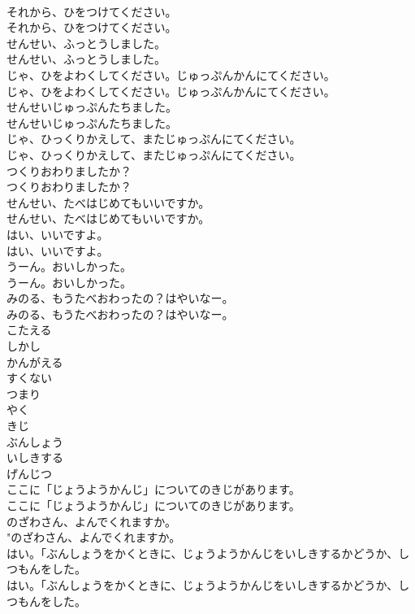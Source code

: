 \documentclass[8pt]{extreport}
\begin{document}
\begin{CJK}{UTF8}{min}
\\	それから、ひをつけてください。	
\\	それから、ひをつけてください。 
\\	せんせい、ふっとうしました。	
\\	せんせい、ふっとうしました。 
\\	じゃ、ひをよわくしてください。じゅっぷんかんにてください。	
\\	じゃ、ひをよわくしてください。じゅっぷんかんにてください。 
\\	せんせいじゅっぷんたちました。	
\\	せんせいじゅっぷんたちました。 
\\	じゃ、ひっくりかえして、またじゅっぷんにてください。	
\\	じゃ、ひっくりかえして、またじゅっぷんにてください。 
\\	つくりおわりましたか？	
\\	つくりおわりましたか？ 
\\	せんせい、たべはじめてもいいですか。	
\\	せんせい、たべはじめてもいいですか。 
\\	はい、いいですよ。	
\\	はい、いいですよ。 
\\	うーん。おいしかった。	
\\	うーん。おいしかった。 
\\	みのる、もうたべおわったの？はやいなー。	
\\	みのる、もうたべおわったの？はやいなー。 
\\	こたえる
\\	しかし
\\	かんがえる
\\	すくない
\\	つまり
\\	やく
\\	きじ
\\	ぶんしょう
\\	いしきする
\\	げんじつ
\\	ここに「じょうようかんじ」についてのきじがあります。	
\\	ここに「じょうようかんじ」についてのきじがあります。 
\\	のざわさん、よんでくれますか。	
\\	"のざわさん、よんでくれますか。 
\\	はい。「ぶんしょうをかくときに、じょうようかんじをいしきするかどうか、しつもんをした。	
\\	はい。「ぶんしょうをかくときに、じょうようかんじをいしきするかどうか、しつもんをした。 

\end{CJK}
\end{document}
